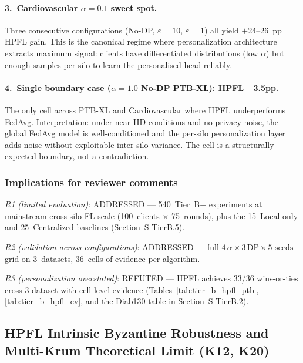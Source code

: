 \documentclass[conference]{IEEEtran}
\begin{document}
\paragraph{3.\ Cardiovascular $\alpha{=}0.1$ sweet spot.} Three consecutive configurations (No-DP, $\varepsilon{=}10$, $\varepsilon{=}1$) all yield $+$24--26~pp HPFL gain. This is the canonical regime where personalization architecture extracts maximum signal: clients have differentiated distributions (low $\alpha$) but enough samples per silo to learn the personalised head reliably.

\paragraph{4.\ Single boundary case ($\alpha{=}1.0$ No-DP PTB-XL): HPFL $-$3.5pp.} The only cell across PTB-XL and Cardiovascular where HPFL underperforms FedAvg. Interpretation: under near-IID conditions and no privacy noise, the global FedAvg model is well-conditioned and the per-silo personalization layer adds noise without exploitable inter-silo variance. The cell is a structurally expected boundary, not a contradiction.

\subsubsection*{Implications for reviewer comments}

\emph{R1 (limited evaluation)}: ADDRESSED --- 540~Tier~B+ experiments at mainstream cross-silo FL scale (100~clients $\times$ 75~rounds), plus the 15~Local-only and 25~Centralized baselines (Section~S-TierB.5).

\emph{R2 (validation across configurations)}: ADDRESSED --- full $4\,\alpha \times 3\,\text{DP} \times 5 \text{ seeds}$ grid on 3~datasets, 36~cells of evidence per algorithm.

\emph{R3 (personalization overstated)}: REFUTED --- HPFL achieves 33/36 wins-or-ties cross-3-dataset with cell-level evidence (Tables~\ref{tab:tier_b_hpfl_ptb}, \ref{tab:tier_b_hpfl_cv}, and the Diab130 table in Section~S-TierB.2).

\subsection{HPFL Intrinsic Byzantine Robustness and Multi-Krum Theoretical Limit (K12, K20)}
\label{sec:tier_b_byzantine}
\end{document}
